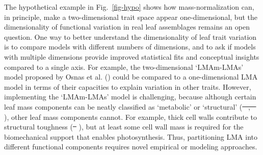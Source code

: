 \documentclass[
  12pt,
  letterpaper,
  DIV=11,
  numbers=noendperiod]{scrartcl}
\providecommand{\DIFadd}[1]{{\protect\color{blue}\uwave{#1}}} %
\providecommand{\DIFdel}[1]{{\protect\color{red}\sout{#1}}}                      %
\providecommand{\DIFaddbegin}{} %
\providecommand{\DIFaddend}{} %
\providecommand{\DIFdelbegin}{} %
\providecommand{\DIFdelend}{} %
\newcommand{\DIFscaledelfig}{0.5}
\newlength{\DIFdelgraphicswidth} %
\newlength{\DIFdelgraphicsheight} %
\newcommand{\DIFaddincludegraphics}[2][]{{\color{blue}\fbox{\DIFOincludegraphics[#1]{#2}}}} %
\newcommand{\DIFdelincludegraphics}[2][]{%
\sbox{\DIFdelgraphicsbox}{\DIFOincludegraphics[#1]{#2}}%
\settoboxwidth{\DIFdelgraphicswidth}{\DIFdelgraphicsbox} %
\settoboxtotalheight{\DIFdelgraphicsheight}{\DIFdelgraphicsbox} %
\scalebox{\DIFscaledelfig}{%
\parbox[b]{\DIFdelgraphicswidth}{\usebox{\DIFdelgraphicsbox}\\[-\baselineskip] \rule{\DIFdelgraphicswidth}{0em}}\llap{\resizebox{\DIFdelgraphicswidth}{\DIFdelgraphicsheight}{%
\setlength{\unitlength}{\DIFdelgraphicswidth}%
\begin{picture}(1,1)%
\thicklines\linethickness{2pt} %
{\color[rgb]{1,0,0}\put(0,0){\framebox(1,1){}}}%
{\color[rgb]{1,0,0}\put(0,0){\line( 1,1){1}}}%
{\color[rgb]{1,0,0}\put(0,1){\line(1,-1){1}}}%
\end{picture}%
}\hspace*{3pt}}} %
} %
\DeclareRobustCommand{\DIFaddbegin}{\DIFOaddbegin \let\includegraphics\DIFaddincludegraphics} %
\DeclareRobustCommand{\DIFaddend}{\DIFOaddend \let\includegraphics\DIFOincludegraphics} %
\DeclareRobustCommand{\DIFdelbegin}{\DIFOdelbegin \let\includegraphics\DIFdelincludegraphics} %
\DeclareRobustCommand{\DIFdelend}{\DIFOaddend \let\includegraphics\DIFOincludegraphics} %
\begin{document}
The hypothetical example in Fig.~\ref{fig-hypo} shows how
mass-normalization can, in principle, make a two-dimensional trait space
appear one-dimensional, but the dimensionality of functional variation
in real leaf assemblages remains an open question. One way to better
understand the dimensionality of leaf trait variation is to compare
models with different numbers of dimensions, and to ask if models with
multiple dimensions provide improved statistical fits and conceptual
insights compared to a single axis. For example, the two-dimensional
`LMAm-LMAs' model proposed by Osnas et al.
() could be compared to a one-dimensional
LMA model in terms of their capacities to explain variation in other
traits. However, implementing the `LMAm-LMAs' model is challenging,
because although certain leaf mass components can be neatly classified
as `metabolic' or `structural' (\DIFdelbegin \DIFdel{\mbox{%
\citeproc{ref-Poorter2009}{Poorter et
al. 2009}}\hspace{0pt}%
, \mbox{%
\citeproc{ref-Osnas2018}{Osnas et al. 2018}}\hspace{0pt}%
}\DIFdelend \DIFaddbegin \DIFadd{\mbox{%
\citeproc{ref-Osnas2018}{Osnas et al.,
2018}}\hspace{0pt}%
; \mbox{%
\citeproc{ref-Poorter2009}{Poorter et al., 2009}}\hspace{0pt}%
}\DIFaddend ), other leaf
mass components cannot. For example, thick cell walls contribute to
structural toughness (\DIFdelbegin \DIFdel{\mbox{%
\citeproc{ref-Onoda2015}{Onoda et al. 2015}}\hspace{0pt}%
}\DIFdelend \DIFaddbegin \DIFadd{\mbox{%
\citeproc{ref-Onoda2015}{Onoda et al., 2015}}\hspace{0pt}%
}\DIFaddend ), but
at least some cell wall mass is required for the biomechanical support
that enables photosynthesis. Thus, partitioning LMA into different
functional components requires novel empirical or modeling approaches.
\end{document}

